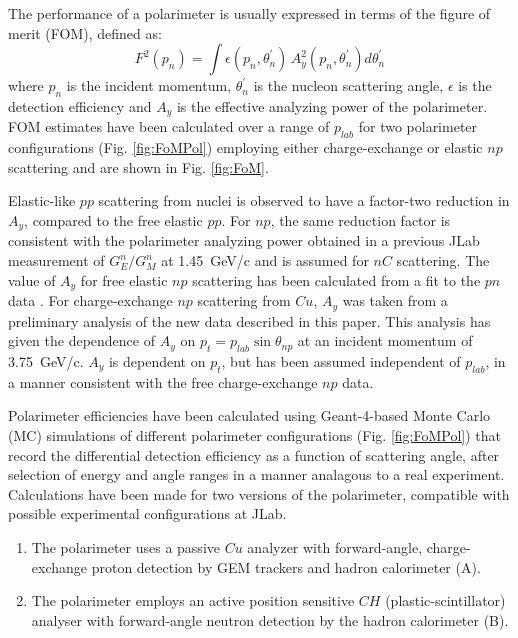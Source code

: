 \documentclass[epj]{svjour}
\begin{document}
The performance of a polarimeter is usually expressed in terms of 
the figure of merit (FOM),  defined as: 
\begin{equation}
F^{2}(p_{n})=\int\epsilon(p_{n},\theta_{n}^{'})\,A_{y}^{2}(p_{n},\theta_{n}^{'})d\theta_{n}^{'}
\label{eq:FOM}
\end{equation}
where $p_n$ is the incident momentum, $\theta_{n}^{'}$ is the nucleon scattering angle, $\epsilon$ is the detection efficiency and $A_y$ is the effective analyzing power of the polarimeter. FOM estimates have been calculated over a range of $p_{lab}$ for two polarimeter configurations
(Fig. \ref{fig:FoMPol}) employing either charge-exchange or elastic $np$
scattering and are shown in Fig. \ref{fig:FoM}.

Elastic-like $pp$ scattering from nuclei is observed to have a factor-two
reduction in $A_{y}$,  compared to the free elastic $pp$. For $np$, the same reduction factor is consistent with the
polarimeter analyzing power obtained in a previous JLab measurement
of $ G_{E}^{n}/G_{M}^{n} $ \cite{PR12-11-009} at 1.45~GeV/c and is assumed for $nC$ scattering.
The value of $A_{y}$ for free elastic $np$ scattering has been
calculated from a fit  to the $pn$ data \cite{Ladygin:409018}. For charge-exchange $np$ scattering from $Cu$, $A_{y}$
was taken from a preliminary analysis of the new data described in
this paper. This analysis has given the dependence of $A_{y}$ on
$p_{t}=p_{lab}\sin\theta_{np}$ at an incident momentum of 3.75~GeV/c.
$A_{y}$ is dependent on $p_{t}$, but has been assumed independent
of $p_{lab}$, in a manner consistent with the free charge-exchange
$np$ data.

Polarimeter efficiencies have been calculated using Geant-4-based Monte Carlo (MC)
simulations of different polarimeter configurations (Fig. \ref{fig:FoMPol}) that record the differential detection
efficiency as a function of scattering angle, after selection of energy and angle ranges in a manner analagous to a real experiment. Calculations have been made for two versions of the polarimeter, compatible
with possible experimental configurations at JLab. 
\begin{enumerate}
\item The polarimeter uses a passive $Cu$ analyzer with forward-angle, charge-exchange
proton detection by GEM trackers and hadron calorimeter (A).
\item The polarimeter employs an active position sensitive $CH$ (plastic-scintillator)
analyser with forward-angle neutron detection by the hadron calorimeter (B).
\end{enumerate}
\end{document}
